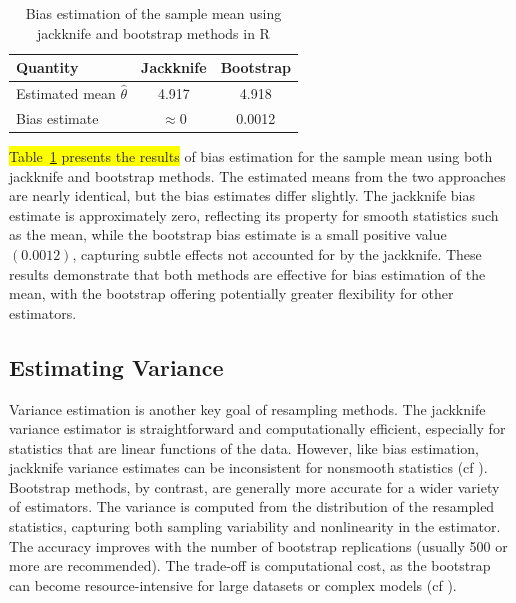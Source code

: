 \documentclass[aodsor,preprint]{imsart}
\numberwithin{equation}{section}
\theoremstyle{plain}
\begin{document}
\begin{table}[h!]
\centering
\caption{Bias estimation of the sample mean using jackknife and bootstrap methods in R}
\begin{tabular}{lcc}
\hline
\textbf{Quantity} & \textbf{Jackknife} & \textbf{Bootstrap} \\
\hline
Estimated mean $\hat{\theta}$ & 4.917 & 4.918 \\
Bias estimate                 & $\approx 0$ & 0.0012 \\
\hline
\end{tabular}
\label{tab:bias-comparison}
\end{table}

 \colorbox{yellow}{Table~\ref{tab:bias-comparison} presents the results} of bias estimation for the sample mean using both jackknife and bootstrap methods. The estimated means from the two approaches are nearly identical, but the bias estimates differ slightly. The jackknife bias estimate is approximately zero, reflecting its property for smooth statistics such as the mean, while the bootstrap bias estimate is a small positive value $(0.0012)$, capturing subtle effects not accounted for by the jackknife. These results demonstrate that both methods are effective for bias estimation of the mean, with the bootstrap offering potentially greater flexibility for other estimators.

\subsection{Estimating Variance}

Variance estimation is another key goal of resampling methods. The jackknife variance estimator is straightforward and computationally efficient, especially for statistics that are linear functions of the data. However, like bias estimation, jackknife variance estimates can be inconsistent for nonsmooth statistics (cf \cite{tukey1958bias,shao1995jackknife}).\\

Bootstrap methods, by contrast, are generally more accurate for a wider variety of estimators. The variance is computed from the distribution of the resampled statistics, capturing both sampling variability and nonlinearity in the estimator. The accuracy improves with the number of bootstrap replications (usually 500 or more are recommended). The trade-off is computational cost, as the bootstrap can become resource-intensive for large datasets or complex models (cf \cite{efron1993introduction,shao1995jackknife,davison1997bootstrap}).\\
\end{document}
